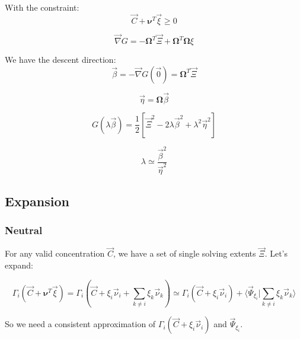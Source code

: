 \documentclass[aps,12pt]{revtex4}
\begin{document}
With the constraint:
\begin{equation}
	\vec{C} + \bm{\nu}^T \vec{\xi} \geq 0
\end{equation}

\begin{equation}
	\vec{\nabla} G = -\bm{\Omega}^T \vec{\Xi} + \bm{\Omega}^T \bm{\Omega} \xi
\end{equation}

We have the descent direction:
\begin{equation}
	\vec{\beta} = - \vec{\nabla}G(\vec{0}) = \bm{\Omega}^T \vec{\Xi}
\end{equation}

\begin{equation}
	\vec{\eta} = \bm{\Omega}\vec{\beta}
\end{equation}

\begin{equation}
	G(\lambda\vec{\beta}) = \dfrac{1}{2} 
	\left[
	\vec{\Xi}^2 - 2 \lambda \vec{\beta}^2 + \lambda^2  \vec{\eta}^2
	\right]
\end{equation}

\begin{equation}
	\lambda \simeq \dfrac{\vec{\beta}^2}{\vec{\eta}^2}
\end{equation}

\subsection{Expansion}
\subsubsection{Neutral}
 
For any valid concentration $\vec{C}$, we have a set of single solving extents $\vec{\Xi}$.
Let's expand:

\begin{equation}
\Gamma_i(\vec{C} + \bm{\nu}^T \vec{\xi}) =  \Gamma_i(\vec{C} + \xi_i \vec{\nu}_i + \sum_{k\not=i} \xi_k \vec{\nu}_k)
\simeq \Gamma_i(\vec{C} + \xi_i \vec{\nu}_i) + \langle \vec{\Psi}_{\xi_i} \vert \sum_{k\not=i} \xi_k \vec{\nu}_k \rangle
\end{equation}

So we need a consistent approximation of $\Gamma_i(\vec{C} + \xi_i \vec{\nu}_i)$ and $\vec{\Psi}_{\xi_i}$.
\end{document}
